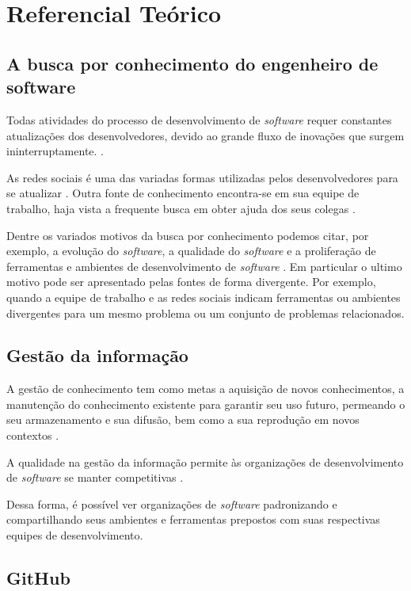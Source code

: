 \chapter{Referencial Teórico}

\section{A busca por conhecimento do engenheiro de software}

Todas atividades do processo de desenvolvimento de \textit{software} requer constantes atualizações dos desenvolvedores, devido ao grande fluxo de inovações que surgem ininterruptamente. \cite{Singer2014}.

As redes sociais é uma das variadas formas utilizadas pelos desenvolvedores para se atualizar \cite{Treude2012} \cite{Storey:2014:ESM:2593882.2593887}. Outra fonte de conhecimento encontra-se em sua equipe de trabalho, haja vista a frequente busca em obter ajuda dos seus colegas \cite{Weinberg1998}.

Dentre os variados motivos da busca por conhecimento podemos citar, por exemplo, a evolução do \textit{software}, a qualidade do \textit{software} e a proliferação de ferramentas e ambientes de desenvolvimento de \textit{software} \cite{Jazayeri:2004:ESE:1025115.1025201}. Em particular o ultimo motivo pode ser apresentado pelas fontes de forma divergente. Por exemplo, quando a equipe de trabalho e as redes sociais indicam ferramentas ou ambientes divergentes para um mesmo problema ou um conjunto de problemas relacionados.

\section{Gestão da informação}

A gestão de conhecimento tem como metas a aquisição de novos conhecimentos, a manutenção do conhecimento existente para garantir seu uso futuro, permeando o seu armazenamento e sua difusão, bem como a sua reprodução em novos contextos \cite{Bjornson2008}.

A qualidade na gestão da informação permite às organizações de desenvolvimento de \textit{software} se manter competitivas \cite{Rabelo2015}.

Dessa forma, é possível ver organizações de \textit{software} padronizando e compartilhando seus ambientes e ferramentas prepostos com suas respectivas equipes de desenvolvimento.

\section{GitHub}

